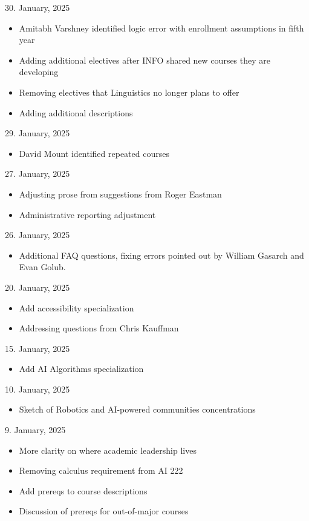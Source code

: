 30. January, 2025
\begin{itemize}
  \item Amitabh Varshney identified logic error with enrollment assumptions in fifth year
  \item Adding additional electives after INFO shared new courses they are developing
  \item Removing electives that Linguistics no longer plans to offer 
  \item Adding additional descriptions
\end{itemize}

29. January, 2025
\begin{itemize}
  \item David Mount identified repeated courses
\end{itemize}

27. January, 2025
\begin{itemize}
    \item Adjusting prose from suggestions from Roger Eastman
    \item Administrative reporting adjustment
\end{itemize}

26. January, 2025
\begin{itemize}
  \item Additional FAQ questions, fixing errors pointed out by William Gasarch and Evan Golub.
\end{itemize}

20. January, 2025
\begin{itemize}
 \item Add accessibility specialization
 \item Addressing questions from Chris Kauffman
\end{itemize}

15. January, 2025
\begin{itemize}
\item Add AI Algorithms specialization
\end{itemize}

10. January, 2025
\begin{itemize}
  \item Sketch of Robotics and AI-powered communities concentrations
\end{itemize}

9. January, 2025

\begin{itemize}
  \item More clarity on where academic leadership lives
  \item Removing calculus requirement from AI 222
  
  \item Add prereqs to course descriptions
  \item Discussion of prereqs for out-of-major courses
\end{itemize}

